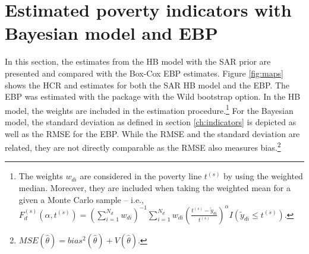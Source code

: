 \section{Estimated poverty indicators with Bayesian model and EBP}
In this section, the estimates from the HB model with the SAR prior are presented and compared with the Box-Cox EBP estimates.
Figure \ref{fig:maps} shows the HCR and estimates for both the SAR HB model and the EBP.
The EBP was estimated with the  package \citep{kreutzmann_r_2019} with the Wild bootstrap option.
In the HB model, the weights are included in the estimation procedure.\footnote{The weights $w_{di}$ are considered in the poverty line $t^{(s)}$ by using the weighted median. Moreover, they are included when taking the weighted mean for a given a Monte Carlo sample – i.e., $F^{(s)}_d(\alpha, t^{(s)}) = ({\sum_{i=1}^{N_d} w_{di}})^{-1} \sum_{i=1}^{N_d} w_{di}\left( \frac{t^{(s)} - \tilde y_{di}}{t^{(s)}} \right)^\alpha I (\tilde y_{di} \le t^{(s)})$.}
For the Bayesian model, the standard deviation as defined in section \ref{ch:indicators} is depicted as well as the RMSE for the EBP.
While the RMSE and the standard deviation are related, they are not directly comparable as the RMSE also measures bias.\footnote{$MSE(\hat \theta) = bias^2(\hat \theta) + V(\hat \theta).$}


